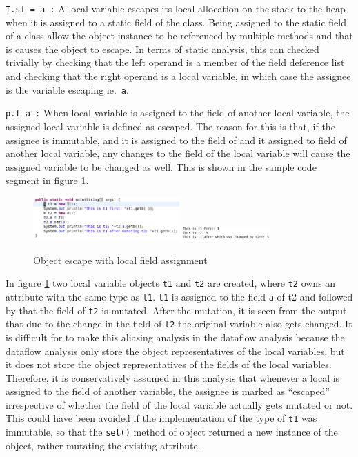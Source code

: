 \texttt{T.sf = a :} A local variable escapes its local allocation on the stack to the heap when it is assigned to a static field of the class. Being assigned to the static field of a class allow the object instance to be referenced by multiple methods and that is causes the object to escape. In terms of static analysis, this can checked trivially by checking that the left operand is a member of the field deference list and checking that the right operand is a local variable, in which case the assignee is the variable escaping ie.\ \texttt{a}.

\texttt{p.f  a :} When local variable is assigned to the field of another local variable, the assigned local variable is defined as escaped. The reason for this is that, if the assignee is immutable, and it is assigned to the field of and it assigned to field of another local variable, any changes to the field of the local variable will cause the assigned variable to be changed as well. This is shown in the sample code segment in figure \ref{fig:fieldassignment}.

\begin{figure}[H]
	\caption{Object escape with local field assignment} \label{fig:fieldassignment}
	\includegraphics[width=0.5\textwidth]{img/fieldassignmentcod}
	\includegraphics[width=0.3\textwidth]{img/fieldassignmentresult}
\end{figure}

In figure \ref{fig:fieldassignment} two local variable objects \texttt{t1} and \texttt{t2} are created, where \texttt{t2} owns an attribute with the same type as \texttt{t1}. \texttt{t1} is assigned to the field \texttt{a} of t2 and followed by that the field of \texttt{t2} is mutated. After the mutation, it is seen from the output that due to the change in the field of \texttt{t2} the original variable also gets changed. It is difficult for to make this aliasing analysis in the dataflow analysis because the dataflow analysis only store the object representatives of the local variables, but it does not store the object representatives of the fields of the local variables. Therefore, it is conservatively assumed in this analysis that whenever a local is assigned to the field of another variable, the assignee is marked as ``escaped'' irrespective of whether the field of the local variable actually gets mutated or not. This could have been avoided if the implementation of the type of \texttt{t1} was immutable, so that the \texttt{set()} method of object returned a new instance of the object, rather mutating the existing attribute.

